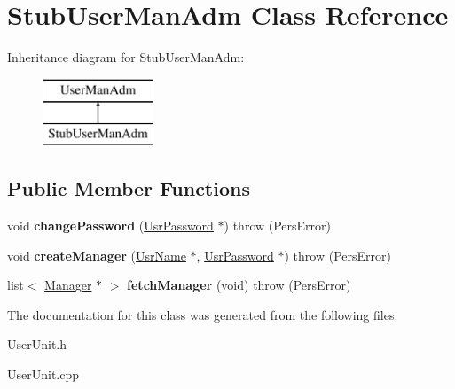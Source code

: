 \hypertarget{classStubUserManAdm}{\section{Stub\-User\-Man\-Adm Class Reference}
\label{dd/dfd/classStubUserManAdm}
}
Inheritance diagram for Stub\-User\-Man\-Adm\-:\begin{figure}[H]
\begin{center}
\leavevmode
\includegraphics[height=2.000000cm]{dd/dfd/classStubUserManAdm}
\end{center}
\end{figure}
\subsection*{Public Member Functions}
\begin{DoxyCompactItemize}
\item 
\hypertarget{classStubUserManAdm_a63130507e95ab092b0bf09704b13b6ec}{void {\bfseries change\-Password} (\hyperlink{classUsrPassword}{Usr\-Password} $\ast$)  throw (\-Pers\-Error)}\label{dd/dfd/classStubUserManAdm_a63130507e95ab092b0bf09704b13b6ec}

\item 
\hypertarget{classStubUserManAdm_ac833e3729b1adf46edf78376719acde5}{void {\bfseries create\-Manager} (\hyperlink{classUsrName}{Usr\-Name} $\ast$, \hyperlink{classUsrPassword}{Usr\-Password} $\ast$)  throw (\-Pers\-Error)}\label{dd/dfd/classStubUserManAdm_ac833e3729b1adf46edf78376719acde5}

\item 
\hypertarget{classStubUserManAdm_a1d8b9e3691aef8438bf0b125efb54972}{list$<$ \hyperlink{classManager}{Manager} $\ast$ $>$ {\bfseries fetch\-Manager} (void)  throw (\-Pers\-Error)}\label{dd/dfd/classStubUserManAdm_a1d8b9e3691aef8438bf0b125efb54972}

\end{DoxyCompactItemize}


The documentation for this class was generated from the following files\-:\begin{DoxyCompactItemize}
\item 
User\-Unit.\-h\item 
User\-Unit.\-cpp\end{DoxyCompactItemize}
